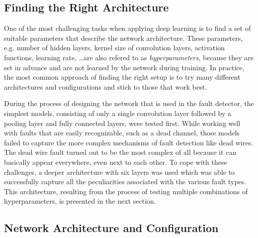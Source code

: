 \subsection{Finding the Right Architecture}

One of the most challenging tasks when applying deep learning is to
find a set of suitable parameters that describe the network
architecture. These parameters, e.g. number of hidden layers, kernel
size of convolution layers, activation functions, learning rate,
\ldots are also refered to as \textit{hyperparameters}, because they
are set in advance and are not learned by the network during training.
In practice, the most common approach of finding the right
setup is to try many different architectures and configurations
and stick to those that work best.

During the process of designing the network that is used in the fault
detector, the simplest models, consisting of only a single convolution
layer followed by a pooling layer and fully connected layers, were
tested first. While working well with faults that are easily
recognizable, such as a dead channel, those models failed to capture
the more complex mechanisms of fault detection like dead wires. The
dead wire fault turned out to be the most complex of all because it
can basically appear everywhere, even next to each other. To cope with
these challenges, a deeper
architecture with six layers was used which was able to successfully
capture all the peculiarities associated with the various fault
types. This architecture, resulting from the process of testing
multiple combinations of hyperparameters, is presented in the next
section.

\subsection{Network Architecture and Configuration}

